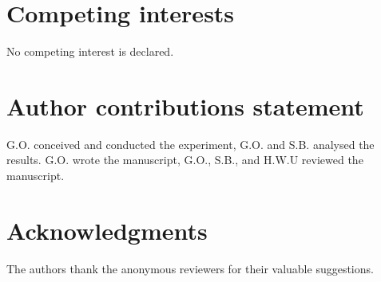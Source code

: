 \documentclass[unnumsec,webpdf,modern,large]{oup-authoring-template}
\theoremstyle{thmstyleone}%
\theoremstyle{thmstyletwo}%
\theoremstyle{thmstylethree}%
\begin{document}
\newpage

\section{Competing interests}
No competing interest is declared.

\section{Author contributions statement}

G.O. conceived and conducted the experiment, G.O. and S.B. analysed the results. G.O. wrote the manuscript, G.O., S.B., and H.W.U reviewed the manuscript.

\section{Acknowledgments}
The authors thank the anonymous reviewers for their valuable suggestions.



\end{document}
